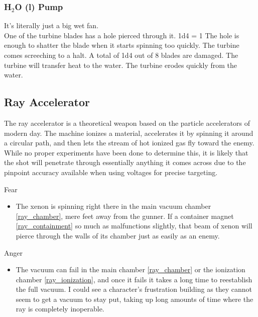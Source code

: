 \documentclass[a4paper]{article}
\begin{document}
\vspace{-0.5cm} \hspace{-18pt} \subsubsection{H$_2$O (l) Pump} \label{railgun_h2o_l_pump} \vspace{-0.2cm}
It's literally just a big wet fan.
\\ \pbhw
{One of the turbine blades has a hole pierced through it. \newline 1d4 = 1 The hole is enough to shatter the blade when it starts spinning too quickly. }
{The turbine comes screeching to a halt. A total of 1d4 out of 8 blades are damaged.}
{The turbine will transfer heat to the water.} 
{The turbine erodes quickly from the water.}


\newpage
\subsection{Ray Accelerator} \label{ray}

The ray accelerator is a theoretical weapon based on the particle accelerators of modern day. The machine ionizes a material, accelerates it by spinning it around a circular path, and then lets the stream of hot ionized gas fly toward the enemy. While no proper experiments have been done to determine this, it is likely that the shot will penetrate through essentially anything it comes across due to the pinpoint accuracy available when using voltages for precise targeting.

\vspace{0.3cm}
\begin{minipage}[t]{0.4\linewidth}
Fear
\begin{itemize}
\item The xenon is spinning right there in the main vacuum chamber \ref{ray_chamber}, mere feet away from the gunner. If a container magnet \ref{ray_containment} so much as malfunctions slightly, that beam of xenon will pierce through the walls of its chamber just as easily as an enemy. 
\end{itemize}
\end{minipage} 
\begin{minipage}[t]{0.4\linewidth}
Anger
\begin{itemize}
\item The vacuum can fail in the main chamber \ref{ray_chamber} or the ionization chamber \ref{ray_ionization}, and once it fails it takes a long time to reestablish the full vacuum. I could see a character's frustration building as they cannot seem to get a vacuum to stay put, taking up long amounts of time where the ray is completely inoperable.
\end{itemize}
\end{minipage}
\end{document}
